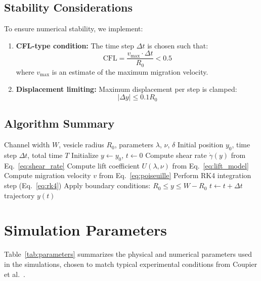 \documentclass{article}
\begin{document}
\subsection{Stability Considerations}

To ensure numerical stability, we implement:
\begin{enumerate}
    \item \textbf{CFL-type condition:} The time step $\Delta t$ is chosen such that:
    \begin{equation}
        \text{CFL} = \frac{v_{\max} \cdot \Delta t}{R_0} < 0.5
    \end{equation}
    where $v_{\max}$ is an estimate of the maximum migration velocity.
    
    \item \textbf{Displacement limiting:} Maximum displacement per step is clamped:
    \begin{equation}
        |\Delta y| \leq 0.1 R_0
    \end{equation}
\end{enumerate}

\subsection{Algorithm Summary}

\begin{algorithm}[H]
\caption{Vesicle Migration Simulation}
\begin{algorithmic}[1]
\Require Channel width $W$, vesicle radius $R_0$, parameters $\lambda$, $\nu$, $\delta$
\Require Initial position $y_0$, time step $\Delta t$, total time $T$
\State Initialize $y \gets y_0$, $t \gets 0$
    \State Compute shear rate $\dot{\gamma}(y)$ from Eq.~\eqref{eq:shear_rate}
    \State Compute lift coefficient $U(\lambda, \nu)$ from Eq.~\eqref{eq:lift_model}
    \State Compute migration velocity $v$ from Eq.~\eqref{eq:poiseuille}
    \State Perform RK4 integration step (Eq.~\eqref{eq:rk4})
    \State Apply boundary conditions: $R_0 \leq y \leq W - R_0$
    \State $t \gets t + \Delta t$
\EndWhile
\State \Return trajectory $y(t)$
\end{algorithmic}
\end{algorithm}

\section{Simulation Parameters}

Table~\ref{tab:parameters} summarizes the physical and numerical parameters used in the simulations, chosen to match typical experimental conditions from Coupier et al.~\cite{coupier2009}.
\end{document}
